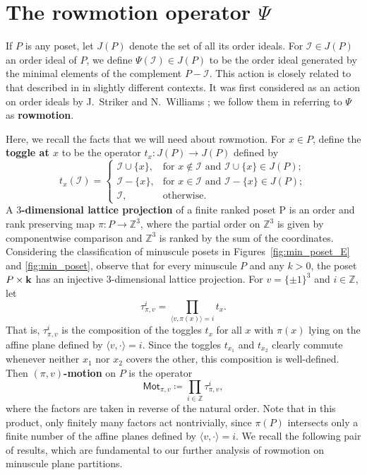 \documentclass[12pt]{amsart}
\theoremstyle{definition}
\theoremstyle{remark}
\numberwithin{equation}{section}
\newcommand{\mot}{\ensuremath{\mathsf{Mot}}}
\newcommand{\uu}{\mathcal{I}}
\begin{document}
\section{The rowmotion operator $\Psi$}\label{sec:rowmotion}

If $P$ is any poset, let $J(P)$ denote the set of all its order ideals. For $\uu \in J(P)$ an order ideal of $P$, we define $\Psi(\uu) \in J(P)$ to be the order ideal generated by the minimal elements of the complement $P - \uu$. This action is closely related to that described in \cite{Brouwer.Schrijver,Duchet,Cameron.Fonderflaass} in slightly different contexts. It was first considered as an action on order ideals by J.~Striker and N.~Williams \cite{Striker.Williams}; we follow them in referring to $\Psi$ as {\bf rowmotion}.

Here, we recall the facts that we will need about rowmotion. For $x \in P$, define the {\bf toggle at $x$} to be the operator $t_x : J(P) \to J(P)$ defined by
\[
t_x(\uu) = \left\{ \begin{array}{ll}
        \uu \cup \{x\}, & \text{for } x \notin \uu \text{ and } \uu \cup \{x\} \in J(P); \\
        \uu - \{x\}, & \text{for } x \in \uu \text{ and } \uu - \{x\} \in J(P);\\
        \uu, & \text{otherwise. }
        \end{array} \right.
\]
A {\bf $3$-dimensional lattice projection} of a finite ranked poset P is an order and rank preserving map $\pi : P \to \mathbb{Z}^3$, where the partial order on $\mathbb{Z}^3$ is given by componentwise comparison and $\mathbb{Z}^3$ is ranked by the sum of the coordinates. Considering the classification of minuscule posets in Figures~\ref{fig:min_poset_E} and \ref{fig:min_poset}, observe that for every minuscule $P$ and any $k > 0$, the poset $P \times {\bf k}$ has an injective $3$-dimensional lattice projection. For $v = \{\pm 1 \}^3$ and $i \in \mathbb{Z}$, let 
\[
\tau_{\pi,v}^i = \prod_{\langle v, \pi(x) \rangle = i} t_x.
\]
That is, $\tau_{\pi,v}^i$ is the composition of the toggles $t_x$ for all $x$ with $\pi(x)$ lying on the affine plane defined by $\langle v, \cdot \rangle = i$. Since the toggles $t_{x_1}$ and $t_{x_2}$ clearly commute whenever neither $x_1$ nor $x_2$ covers the other, this composition is well-defined. Then {\bf  $(\pi, v)$-motion} on $P$ is the operator
\[
\mot_{\pi, v} \coloneqq \prod_{i \in \mathbb{Z}} \tau_{\pi,v}^i,
\]
where the factors are taken in reverse of the natural order. Note that in this product, only finitely many factors act nontrivially, since $\pi(P)$ intersects only a finite number of the affine planes defined by $\langle v, \cdot \rangle = i$. We recall the following pair of results, which are fundamental to our further analysis of rowmotion on minuscule plane partitions.
\end{document}
